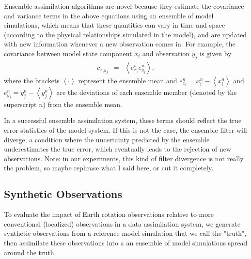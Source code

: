 
Ensemble assimilation algorithms are novel because they estimate the covariance and variance terms in the above equations using an ensemble of model simulations, which means that these quantities can vary in time and space (according to the physical relationships simulated in the model), and are updated with new information whenever a new observation comes in.  
For example, the covariance between model state component $x_i$ and observation $y_j$ is given by
\begin{eqnarray}
c_{x_iy_j} &=& 
\left<
e_{x_i}^n 
e_{y_j}^n
\right>,
\label{eq:covariance} 
\end{eqnarray}
%
%
%
where the brackets $\left< \cdot \right>$ represent the ensemble mean and
$e_{x_i}^n = x_i^n - \left< x_i^n \right>   $ and $e_{y_j}^n = y_j^n - \left< y_j^n \right> $ are the deviations of each ensemble member (denoted by the superscript $n$) from the ensemble mean.

In a successful ensemble assimilation system, these terms should reflect the true error statistics of the model system.
If this is not the case, the ensemble filter will diverge, a condition where the uncertainty predicted by the ensemble underestimates the true error, which eventually leads to the rejection of new observations.
\textcolor{alert}{Note: in our experiments, this kind of filter divergence is not really the problem, so maybe rephrase what I said here, or cut it completely.}

%


\subsection{Synthetic Observations}

To evaluate the impact of Earth rotation observations relative to more conventional (localized) observations in a data assimilation system, we generate synthetic observations from a reference model simulation that we call the "truth", then assimilate these observations into a an ensemble of model simulations spread around the truth.  

